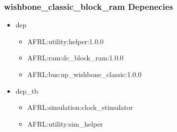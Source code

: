 \subsubsection{wishbone\_classic\_block\_ram Depenecies}
\begin{itemize}
\item dep
	\begin{itemize}
	\item AFRL:utility:helper:1.0.0
	\item AFRL:ram:dc\_block\_ram:1.0.0
	\item AFRL:bus:up\_wishbone\_classic:1.0.0
	\end{itemize}
\item dep\_tb
	\begin{itemize}
	\item AFRL:simulation:clock\_stimulator
	\item AFRL:utility:sim\_helper
	\end{itemize}
\end{itemize}
